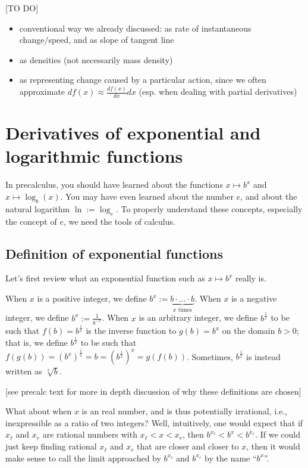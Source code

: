 [TO DO]

\begin{itemize}
    \item conventional way we already discussed: as rate of instantaneous change/speed, and as slope of tangent line
    \item as densities (not necessarily mass density)
    \item as representing change caused by a particular action, since we often approximate $df(x) \approx \frac{df(x)}{dx} dx$ (esp. when dealing with partial derivatives)
\end{itemize}

\newpage

\section*{Derivatives of exponential and logarithmic functions}

In precalculus, you should have learned about the functions $x \mapsto b^x$ and $x \mapsto \log_b(x)$. You may have even learned about the number $e$, and about the natural logarithm $\ln := \log_e$. To properly understand these concepts, especially the concept of $e$, we need the tools of calculus.

\subsection*{Definition of exponential functions}

Let's first review what an exponential function such as $x \mapsto b^x$ really is.

When $x$ is a positive integer, we define $b^x := \underbrace{b \cdot ... \cdot b}_{\text{$x$ times}}$. When $x$ is a negative integer, we define $b^x := \frac{1}{b^{-x}}$. When $x$ is an arbitrary integer, we define $b^{\frac{1}{x}}$ to be such that $f(b) = b^{\frac{1}{x}}$ is the inverse function to $g(b) = b^x$ on the domain $b > 0$; that is, we define $b^{\frac{1}{x}}$ to be such that $f(g(b)) = (b^x)^{\frac{1}{x}} = b = (b^{\frac{1}{x}})^x = g(f(b))$. Sometimes, $b^{\frac{1}{x}}$ is instead written as $\sqrt[x]{b}$.

[see precalc text for more in depth discussion of why these definitions are chosen]

What about when $x$ is an real number, and is thus potentially irrational, i.e., inexpressible as a ratio of two integers? Well, intuitively, one would expect that if $x_{\ell}$ and $x_r$ are rational numbers with $x_{\ell} < x < x_r$, then $b^{x_{\ell}} < b^x < b^{x_r}$. If we could just keep finding rational $x_{\ell}$ and $x_r$ that are closer and closer to $x$, then it would make sense to call the limit approached by $b^{x_{\ell}}$ and $b^{x_r}$ by the name ``$b^x$''.

